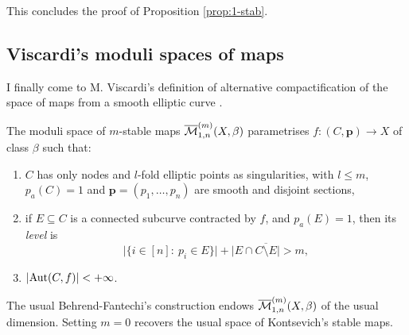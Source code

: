 This concludes the proof of Proposition \ref{prop:1-stab}.

\subsection{Viscardi's moduli spaces of maps} I finally come to M. Viscardi's definition of alternative compactification of the space of maps from a smooth elliptic curve \cite[Definition 2.15]{VISC}.

\begin{dfn}
 The moduli space of $m$-stable maps $\overline{\mathcal{M}}^{(m)}_{1,n}(X,\beta)$ parametrises $f\colon (C,\mathbf p)\to X$ of class $\beta$ such that:\begin{enumerate}
                                                                                                                                      \item $C$ has only nodes and $l$-fold elliptic points as singularities, with $l\leq m$, $p_a(C)=1$ and $\mathbf{p}=(p_1,\ldots,p_n)$ are smooth and disjoint sections,
                                                                                                                                      \item if $E\subseteq C$ is a connected subcurve contracted by $f$, and $p_a(E)=1$, then its \emph{level} is \[\lvert \{i\in[n]:\ p_i\in E\}\rvert+\lvert E\cap \overline{C\setminus E}\rvert >m,\]
                                                                                                                                      \item $\lvert\operatorname{Aut}(C,f)\rvert<+\infty$.
                                                                                                                                     \end{enumerate}

\end{dfn}
The usual Behrend-Fantechi's construction \cite[Proposition 6.2]{BF} endows $\overline{\mathcal{M}}^{(m)}_{1,n}(X,\beta)$ of the usual dimension. Setting $m=0$ recovers the usual space of Kontsevich's stable maps.

